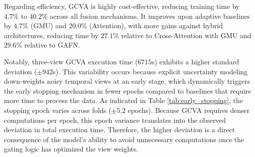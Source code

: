 \documentclass[journal]{IEEEtran}
\begin{document}
Regarding efficiency, GCVA is highly cost-effective, reducing training time by $4.7\%$ to $40.2\%$ across all fusion mechanisms. It improves upon adaptive baselines by $4.7\%$ (GMU) and $20.0\%$ (Attention), with more gains against hybrid architectures, reducing time by $27.1\%$ relative to Cross-Attention with GMU and $29.6\%$ relative to GAFN. 

Notably, three-view GCVA execution time ($6715$s) exhibits a higher standard deviation ($\pm 942$s). This variability occurs because explicit uncertainty modeling down-weights noisy temporal views at an early stage, which dynamically triggers the early stopping mechanism in fewer epochs compared to baselines that require more time to process the data. As indicated in Table \ref{tab:early_stopping}, the stopping epoch varies across folds ($\pm 5.2$ epochs). Because GCVA requires denser computations per epoch, this epoch variance translates into the observed deviation in total execution time. Therefore, the higher deviation is a direct consequence of the model's ability to avoid unnecessary computations once the gating logic has optimized the view weights.
\end{document}
